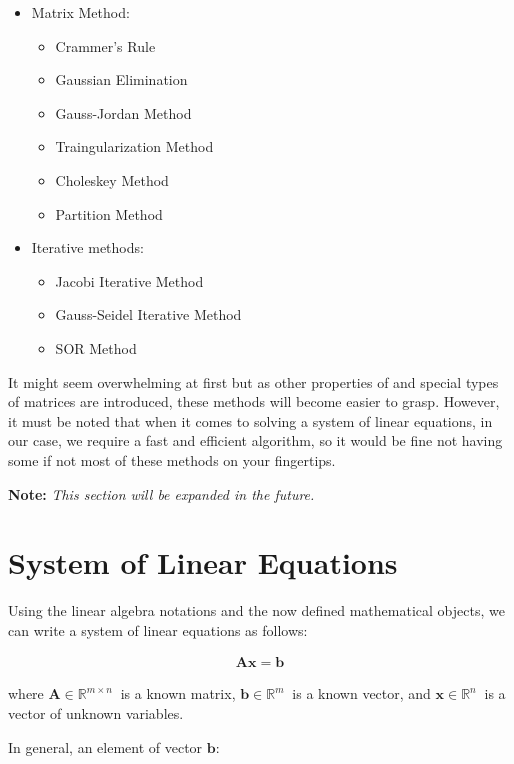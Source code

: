 \documentclass[12pt]{article}
\begin{document}
\begin{itemize}
    \item Matrix Method:
    \begin{itemize}
        \item Crammer's Rule
        \item Gaussian Elimination
        \item Gauss-Jordan Method
        \item Traingularization Method
        \item Choleskey Method
        \item Partition Method
    \end{itemize}
    \item Iterative methods:
    \begin{itemize}
        \item Jacobi Iterative Method
        \item Gauss-Seidel Iterative Method
        \item SOR Method
    \end{itemize}
\end{itemize}

It might seem overwhelming at first but as other properties of and special types of matrices are introduced, these methods will become easier to grasp. However, it must be noted that when it comes to solving a system of linear equations, in our case, we require a fast and efficient algorithm, so it would be fine not having some if not most of these methods on your fingertips.

\textbf{Note:} \textit{This section will be expanded in the future.}

\section{System of Linear Equations}

Using the linear algebra notations and the now defined mathematical objects, we can write a system of linear equations as follows:

\begin{align}
\mathbf{A}\mathbf{x}=\mathbf{b}
\end{align}

where $\mathbf{A}\in\mathbb{R}^{m\times n}\ $ is a known matrix, $\mathbf{b}\in\mathbb{R}^{m}\ $ is a known vector, and $\mathbf{x}\in\mathbb{R}^{n}\ $ is a vector of unknown variables.

In general, an element of vector $\mathbf{b}:$
\end{document}
